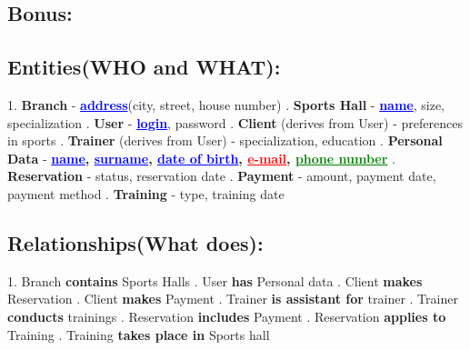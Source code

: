 \documentclass[a4paper,12pt]{article}
\begin{document}
\subsection*{\textbf{Bonus:} }


\subsection*{\textbf{Entities(WHO and WHAT):}}
1. \textbf{Branch} - \textbf{\textcolor{blue}{\underline{address}}}(city, street, house number) . \textbf{Sports Hall} - \textbf{\textcolor{blue}{\underline{name}}}, size, specialization . \textbf{User} - \textbf{\textcolor{blue}{\underline{login}}}, password . \textbf{Client} (derives from User) - preferences in sports . \textbf{Trainer} (derives from User) - specialization, education . \textbf{Personal Data} - \textbf{\textcolor{blue}{\underline{name}}, \textcolor{blue}{\underline{surname}}, \textcolor{blue}{\underline{date of birth}}, \textcolor{red}{\underline{e-mail}}, \textcolor{green}{\underline{phone number}}} . \textbf{Reservation} - status, reservation date . \textbf{Payment} - amount, payment date, payment method . \textbf{Training} - type, training date \newline

\subsection*{\textbf{Relationships(What does):}}
1. Branch \textbf{contains} Sports Halls . User \textbf{has} Personal data . Client \textbf{makes} Reservation . Client \textbf{makes} Payment . Trainer \textbf{is assistant for }trainer . Trainer \textbf{conducts} trainings . Reservation \textbf{includes} Payment . Reservation \textbf{applies to} Training . Training \textbf{takes place in} Sports hall \newline
\end{document}
